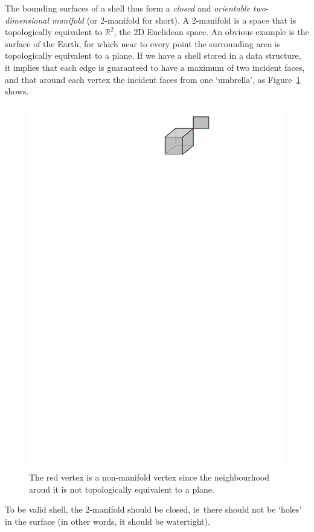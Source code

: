 \documentclass[a4paper,parskip=half,11pt]{scrartcl}
\newcommand{\ie}{ie}
\begin{document}
The bounding surfaces of a shell thus form a \emph{closed} and \emph{orientable}  \emph{two-dimensional manifold} (or 2-manifold for short).
A 2-manifold is a space that is topologically equivalent to $\mathbb{R}^2$, the 2D Euclidean space.
An obvious example is the surface of the Earth, for which near to every point the surrounding area is topologically equivalent to a plane. 
If we have a shell stored in a data structure, it implies that each edge is guaranteed to have a maximum of two incident faces, and that around each vertex the incident faces from one `umbrella', as Figure~\ref{fig:umbrella} shows.
\begin{figure}
  \centering
  \includegraphics[width=0.35\linewidth]{figs/umbrella}
  \caption{The red vertex is a non-manifold vertex since the neighbourhood aroud it is not topologically equivalent to a plane.}
\label{fig:umbrella}
\end{figure}
To be valid shell, the 2-manifold should be closed, \ie\ there should not be `holes' in the surface (in other words, it should be watertight).
\end{document}
